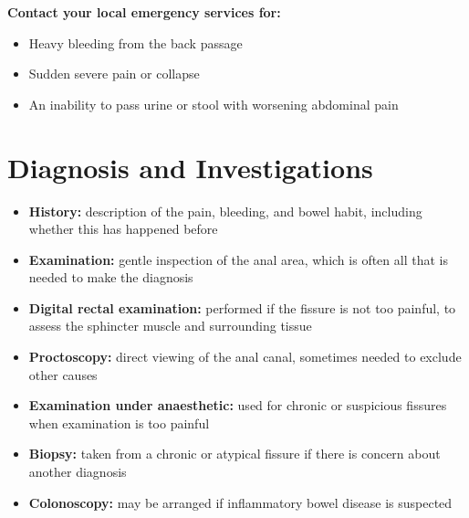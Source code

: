 \textbf{Contact your local emergency services for:}
\begin{itemize}
    \item Heavy bleeding from the back passage
    \item Sudden severe pain or collapse
    \item An inability to pass urine or stool with worsening abdominal pain
\end{itemize}

\section*{Diagnosis and Investigations}
\begin{itemize}
    \item \textbf{History:} description of the pain, bleeding, and bowel habit, including whether this has happened before
    \item \textbf{Examination:} gentle inspection of the anal area, which is often all that is needed to make the diagnosis
    \item \textbf{Digital rectal examination:} performed if the fissure is not too painful, to assess the sphincter muscle and surrounding tissue
    \item \textbf{Proctoscopy:} direct viewing of the anal canal, sometimes needed to exclude other causes
    \item \textbf{Examination under anaesthetic:} used for chronic or suspicious fissures when examination is too painful
    \item \textbf{Biopsy:} taken from a chronic or atypical fissure if there is concern about another diagnosis
    \item \textbf{Colonoscopy:} may be arranged if inflammatory bowel disease is suspected
\end{itemize}

